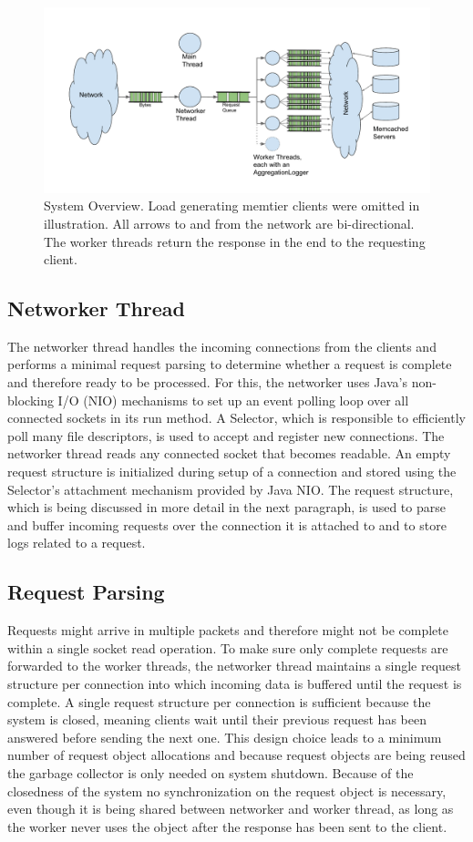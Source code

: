 \documentclass[11pt,a4paper]{article}
\begin{document}
\begin{figure}
    \includegraphics[width=.8\linewidth]{plots/SystemOverview.pdf}
    \caption{System Overview. Load generating memtier clients were omitted in illustration. All arrows to and from the network are bi-directional. The worker threads return the response in the end to the requesting client.}
    \label{fig:Overview}
\end{figure}

\subsection{Networker Thread}
The networker thread handles the incoming connections from the clients and performs a minimal request parsing to determine whether a request is complete and therefore ready to be processed.
For this, the networker uses Java's non-blocking I/O (NIO) mechanisms to set up an event polling loop over all connected sockets in its run method.
A Selector, which is responsible to efficiently poll many file descriptors, is used to accept and register new connections.
The networker thread reads any connected socket that becomes readable.
An empty request structure is initialized during setup of a connection and stored using the Selector's attachment mechanism provided by Java NIO.
The request structure, which is being discussed in more detail in the next paragraph, is used to parse and buffer incoming requests over the connection it is attached to and to store logs related to a request.

\subsection{Request Parsing}
Requests might arrive in multiple packets and therefore might not be complete within a single socket read operation.
To make sure only complete requests are forwarded to the worker threads, the networker thread maintains a single request structure per connection into which incoming data is buffered until the request is complete.
A single request structure per connection is sufficient because the system is closed, meaning clients wait until their previous request has been answered before sending the next one.
This design choice leads to a minimum number of request object allocations and because request objects are being reused the garbage collector is only needed on system shutdown.
Because of the closedness of the system no synchronization on the request object is necessary, even though it is being shared between networker and worker thread, as long as the worker never uses the object after the response has been sent to the client.
\end{document}
